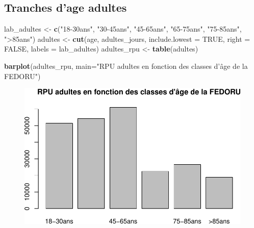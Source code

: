 \documentclass[]{article}
\newenvironment{Shaded}{\begin{snugshade}}{\end{snugshade}}
\newcommand{\KeywordTok}[1]{\textcolor[rgb]{0.13,0.29,0.53}{\textbf{{#1}}}}
\newcommand{\DataTypeTok}[1]{\textcolor[rgb]{0.13,0.29,0.53}{{#1}}}
\newcommand{\DecValTok}[1]{\textcolor[rgb]{0.00,0.00,0.81}{{#1}}}
\newcommand{\StringTok}[1]{\textcolor[rgb]{0.31,0.60,0.02}{{#1}}}
\newcommand{\CommentTok}[1]{\textcolor[rgb]{0.56,0.35,0.01}{\textit{{#1}}}}
\newcommand{\OtherTok}[1]{\textcolor[rgb]{0.56,0.35,0.01}{{#1}}}
\newcommand{\NormalTok}[1]{{#1}}
\begin{document}
\subsection{Tranches d'age adultes}\label{tranches-dage-adultes}

\begin{Shaded}
\begin{Highlighting}[]
\NormalTok{lab_adultes <-}\StringTok{ }\KeywordTok{c}\NormalTok{(}\StringTok{"18-30ans"}\NormalTok{, }\StringTok{"30-45ans"}\NormalTok{, }\StringTok{"45-65ans"}\NormalTok{, }\StringTok{"65-75ans"}\NormalTok{, }\StringTok{"75-85ans"}\NormalTok{, }\StringTok{">85ans"}\NormalTok{)}
\NormalTok{adultes <-}\StringTok{ }\KeywordTok{cut}\NormalTok{(age, adultes_jours, }\DataTypeTok{include.lowest =} \OtherTok{TRUE}\NormalTok{, }\DataTypeTok{right =} \OtherTok{FALSE}\NormalTok{, }\DataTypeTok{labels =} \NormalTok{lab_adultes)}
\NormalTok{adultes_rpu <-}\StringTok{ }\KeywordTok{table}\NormalTok{(adultes)}

\KeywordTok{barplot}\NormalTok{(adultes_rpu, }\DataTypeTok{main=}\StringTok{"RPU adultes en fonction des classes d'âge de la FEDORU"}\NormalTok{)}
\end{Highlighting}
\end{Shaded}

\begin{figure}[htbp]
\centering
\includegraphics{./age_files/figure-latex/adultes-1.pdf}
\end{figure}

\begin{Shaded}
\end{Shaded}
\end{document}
